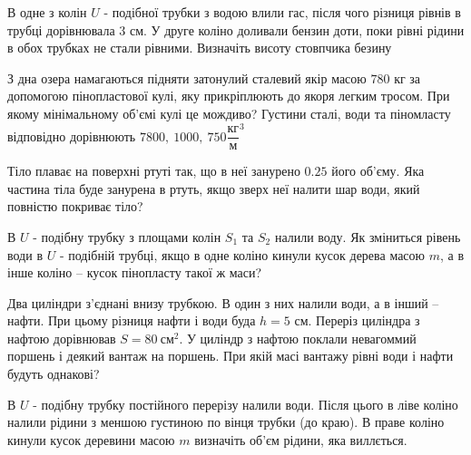 \justifying
\begin{problem}{1}
	В одне з колін $U$ - подібної трубки з водою влили гас, після чого різниця рівнів в трубці дорівнювала $3$ см. У друге коліно доливали бензин доти, поки рівні рідини в обох трубках не стали рівними. Визначіть висоту стовпчика безину
\end{problem}

\begin{problem}{2}
	З дна озера намагаються підняти  затонулий сталевий якір масою $780$ кг за допомогою пінопластової кулі, яку прикріплюють до якоря легким тросом. При якому мінімальному об'ємі кулі це мождиво? Густини сталі, води та піномласту відповідно дорівнюють $7800,~1000, ~750 \dfrac{\text{кг}}{\text{м}}^3$
\end{problem}



\begin{problem}{4}
	Тіло плаває на поверхні ртуті так, що в неї занурено $0.25$ його об'єму. Яка частина тіла буде занурена в ртуть, якщо зверх неї налити шар води, який повністю покриває тіло?
\end{problem}

\begin{problem}{5}
	В $U$ - подібну трубку з площами колін $S_1$ та $S_2$ налили воду. Як зміниться рівень води в $U$ - подібній трубці, якщо в одне коліно кинули кусок дерева масою $m$, а в інше коліно -- кусок пінопласту такої ж маси?
\end{problem}

\begin{problem}{6}
	
	Два циліндри з'єднані внизу трубкою. В один з них налили води, а в інший -- нафти. При цьому різниця нафти і води буда $h = 5$ см. Переріз циліндра з нафтою дорівнював $S = 80~\text{см}^2$. У циліндр з нафтою поклали невагоммий поршень і деякий вантаж на поршень. При якій масі вантажу рівні води і нафти будуть однакові? 
\end{problem}

\begin{problem}{7}
	
	В $U$ - подібну трубку постійного перерізу налили води. Після цього в ліве коліно налили рідини з меншою густиною по вінця трубки (до краю). В праве коліно кинули кусок деревини масою $m$ визначіть об'єм рідини, яка виллється.
\end{problem}







